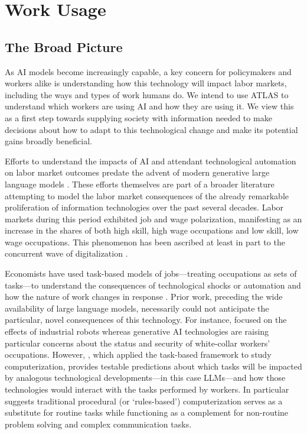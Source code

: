 \documentclass[11pt,a4paper]{article}
\begin{document}
\section{Work Usage}
\label{sec:work_usage}

\subsection{The Broad Picture}


As AI models become increasingly capable, a key concern for policymakers and workers alike is understanding how this technology will impact labor markets, including the ways and types of work humans do. We intend to use ATLAS to understand which workers are using AI and how they are using it. We view this as a first step towards supplying society with information needed to make decisions about how to adapt to this technological change and make its potential gains broadly beneficial.

Efforts to understand the impacts of AI and attendant technological automation on labor market outcomes predate the advent of modern generative large language models \citep[e.g.,][]{Felten2019, Felten2021}. These efforts themselves are part of a broader literature attempting to model the labor market consequences of the already remarkable proliferation of information technologies over the past several decades. Labor markets during this period exhibited job and wage polarization, manifesting as an increase in the shares of both high skill, high wage occupations and low skill, low wage occupations. This phenomenon has been ascribed at least in part to the concurrent wave of digitalization \citep{Acemoglu2011}.

Economists have used task-based models of jobs---treating occupations as sets of tasks---to understand the consequences of technological shocks or automation and how the nature of work changes in response \citep[e.g.,][]{10.1162/003355303322552801, Acemoglu2011, 10.1257/jep.33.2.3}. Prior work, preceding the wide availability of large language models, necessarily could not anticipate the particular, novel consequences of this technology. For instance, \citet{Acemoglu2020} focused on the effects of industrial robots whereas generative AI technologies are raising particular concerns about the status and security of white-collar workers' occupations. However, \citet{10.1162/003355303322552801}, which applied the task-based framework to study computerization, provides testable predictions about which tasks will be impacted by analogous technological developments---in this case LLMs---and how those technologies would interact with the tasks performed by workers. In particular \citet{10.1162/003355303322552801} suggests traditional procedural (or `rules-based') computerization serves as a substitute for routine tasks while functioning as a complement for non-routine problem solving and complex communication tasks.
\end{document}
